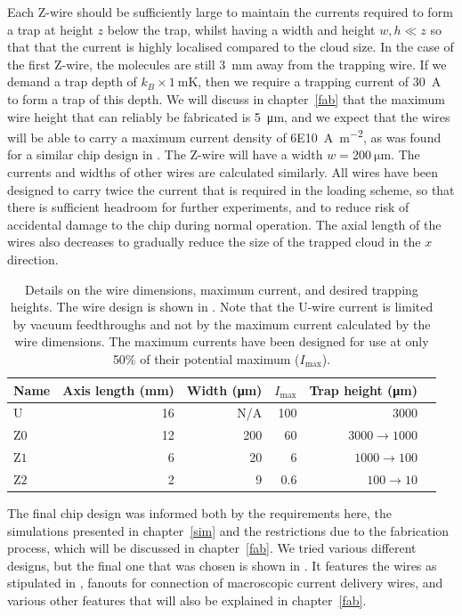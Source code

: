 Each Z-wire should be sufficiently large to maintain the currents required to
form a trap at height $z$ below the trap, whilst having a width and height  $w,
h \ll z$ so that that the current is highly localised compared to the cloud
size.
%
In the case of the first Z-wire, the molecules are still \SI{3}{\milli\meter}
away from the trapping wire. If we demand a trap depth of
$k_B\times\SI{1}{\milli\kelvin}$, then we require a trapping current of
\SI{30}{\ampere} to form a trap of this depth.  We will discuss in
chapter~\ref{fab} that the maximum wire height that can reliably be fabricated
is \SI{5}{\micro\meter}, and we expect that the wires will be able to carry a
maximum current density of \SI{6E10}{\ampere\per\meter\squared}, as was found
for a similar chip design in . The Z-wire will
have a width $w=\SI{200}{\micro\meter}$. The currents and widths of other wires
are calculated similarly.
%
All wires have been designed to
carry twice the current that is required in the loading scheme, so that there
is sufficient headroom for further experiments, and to reduce risk of
accidental damage to the chip during normal operation.
%
The axial length of the wires also decreases to gradually reduce the size of
the trapped cloud in the $x$ direction.  

\begin{table}
  \centering
\begin{tabular}{lrrrrr}
  \hline\hline
  Name & Axis length (\si{\milli\meter}) & Width (\si{\micro\meter})& $I_\text{max}$ & Trap height (\si{\micro\meter}) \\
 \hline
  U & 16 & N/A& 100 & 3000\\
  $\mathrm{Z0}$ & 12 & 200& 60& $3000\rightarrow1000$ \\
  $\mathrm{Z1}$ &  6 & 20& 6& $1000\rightarrow100$ \\
  $\mathrm{Z2}$ &  2 & 9& 0.6& $100\rightarrow10$ \\
 \hline
\end{tabular}
  \caption{Details on the wire dimensions, maximum current, and desired
  trapping heights. The wire design is shown in
  . Note that the U-wire current is
  limited by vacuum feedthroughs and not by the maximum current calculated by
  the wire dimensions.  The maximum currents have been designed for use at only
  50\% of their potential maximum ($I_\text{max}$).
  }
  \label{overview:table:wires}
\end{table}

The final chip design was informed both by the requirements here, the
simulations presented in chapter~\ref{sim} and the restrictions due to the
fabrication process, which will be discussed in chapter~\ref{fab}. We tried
various different designs, but the final one that was chosen is shown in
. It features the wires as stipulated in
, fanouts for connection of macroscopic
current delivery wires, and various other features that will also be explained
in chapter~\ref{fab}.

